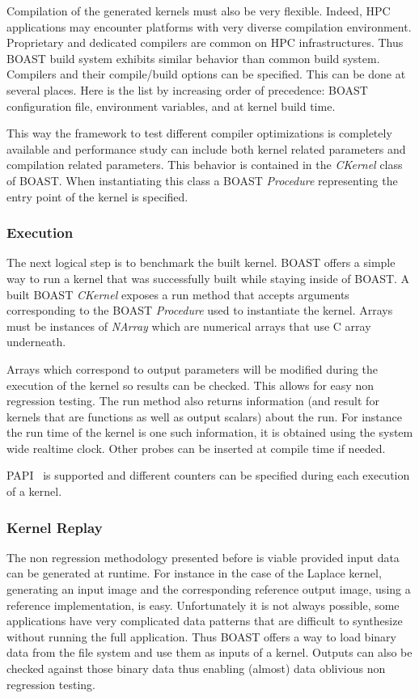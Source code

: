 \documentclass[11pt, a4paper, twoside]{montblanc}
\begin{document}
Compilation of the generated kernels must also be very flexible. Indeed, HPC
applications may encounter platforms with very diverse compilation environment.
Proprietary and dedicated compilers are common on HPC infrastructures. Thus
BOAST build system exhibits similar behavior than common build system. Compilers
and their compile/build options can be specified. This can be done at several
places. Here is the list by increasing order of precedence: BOAST configuration
file, environment variables, and at kernel build time.

This way the framework to test different compiler optimizations is completely
available and performance study can include both kernel related parameters and
compilation related parameters. This behavior is contained in the \emph{CKernel}
class of BOAST. When instantiating this class a BOAST \emph{Procedure}
representing the entry point of the kernel is specified.

  \subsubsection{Execution}

The next logical step is to benchmark the built kernel. BOAST offers a simple
way to run a kernel that was successfully built while staying inside of BOAST.
A built BOAST \emph{CKernel} exposes a run method that accepts arguments corresponding
to the BOAST \emph{Procedure} used to instantiate the kernel. Arrays must be
instances of \emph{NArray} which are numerical arrays that use C array
underneath.

Arrays which correspond to output parameters will be modified during the
execution of the kernel so results can be checked. This allows for easy non
regression testing. The run method also returns information (and result for
kernels that are functions as well as output scalars) about the run. For
instance the run time of the kernel is one such information, it is obtained
using the system wide realtime clock. Other probes can be inserted at compile
time if needed.

PAPI~\cite{mucci1999papi} is supported and different counters can be specified
during each execution of a kernel.

  \subsubsection{Kernel Replay}

The non regression methodology presented before is viable provided input data
can be generated at runtime. For instance in the case of the Laplace kernel,
generating an input image and the corresponding reference output image, using a
reference implementation, is easy. Unfortunately it is not always possible, some
applications have very complicated data patterns that are difficult to
synthesize without running the full application. Thus BOAST offers a way to load
binary data from the file system and use them as inputs of a kernel. Outputs can
also be checked against those binary data thus enabling (almost) data oblivious
non regression testing.
\end{document}
